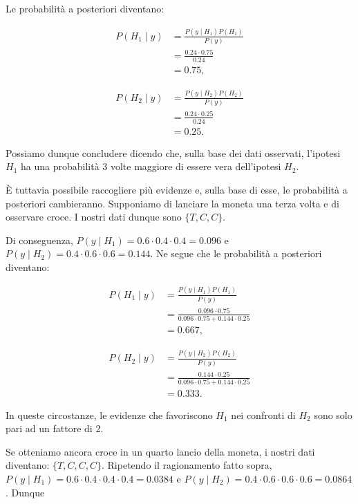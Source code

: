 \documentclass[
  11pt,
]{krantz}
\theoremstyle{definition}
\theoremstyle{definition}
\theoremstyle{definition}
\theoremstyle{definition}
\theoremstyle{remark}
\begin{document}
Le probabilità a posteriori diventano:

\[
\begin{split}
P(H_1 \mid y) &= \frac{P(y \mid H_1) P(H_1)}{P(y)}\\
&= \frac{0.24 \cdot 0.75}{0.24} \\
&= 0.75,
\end{split}
\]

\[
\begin{split}
P(H_2 \mid y) &= \frac{P(y \mid H_2) P(H_2)}{P(y)} \\
&= \frac{0.24 \cdot 0.25}{0.24} \\
&= 0.25.
\end{split}
\]

Possiamo dunque concludere dicendo che, sulla base dei dati osservati, l'ipotesi \(H_1\) ha una probabilità 3 volte maggiore di essere vera dell'ipotesi \(H_2\).

È tuttavia possibile raccogliere più evidenze e, sulla base di esse, le probabilità a posteriori cambieranno. Supponiamo di lanciare la moneta una terza volta e di osservare croce. I nostri dati dunque sono \(\{T, C, C\}\).

Di conseguenza, \(P(y \mid H_1) = 0.6 \cdot 0.4 \cdot 0.4 = 0.096\) e \(P(y \mid H_2) = 0.4 \cdot 0.6 \cdot 0.6 = 0.144\). Ne segue che le probabilità a posteriori diventano:

\[
\begin{split}
P(H_1 \mid y) &= \frac{P(y \mid H_1) P(H_1)}{P(y)} \\
&= \frac{0.096 \cdot 0.75}{0.096 \cdot 0.75 + 0.144 \cdot 0.25} \\
&= 0.667,
\end{split}
\]

\[
\begin{split}
P(H_2 \mid y) &= \frac{P(y \mid H_2) P(H_2)}{P(y)} \\
&= \frac{0.144 \cdot 0.25}{0.096 \cdot 0.75 + 0.144 \cdot 0.25} \\
&= 0.333.
\end{split}
\]

In queste circostanze, le evidenze che favoriscono \(H_1\) nei confronti di \(H_2\) sono solo pari ad un fattore di 2.

Se otteniamo ancora croce in un quarto lancio della moneta, i nostri dati diventano: \(\{T, C, C, C\}\). Ripetendo il ragionamento fatto sopra, \(P(y \mid H_1) = 0.6 \cdot 0.4 \cdot 0.4 \cdot 0.4 = 0.0384\) e \(P(y \mid H_2) = 0.4 \cdot 0.6 \cdot 0.6 \cdot 0.6 = 0.0864\). Dunque
\end{document}
